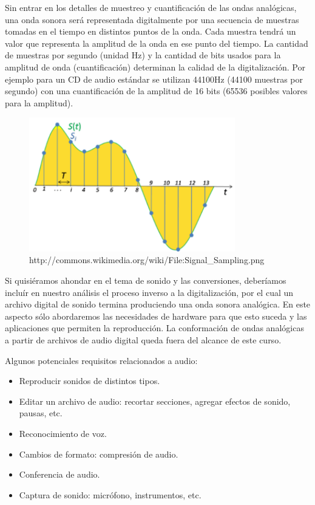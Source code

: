 \documentclass[12pt]{article}
\begin{document}
Sin entrar en los detalles de muestreo y cuantificación de las ondas analógicas, 
una onda sonora será representada digitalmente por una secuencia 
de muestras tomadas en el tiempo en distintos puntos de la onda. Cada muestra 
tendrá un valor que representa la amplitud de la onda en ese punto del tiempo.
La cantidad de muestras por segundo (unidad Hz) y la cantidad de bits usados 
para la amplitud de onda (cuantificación) determinan la calidad de la 
digitalización. Por ejemplo para un CD de audio estándar se utilizan 44100Hz
(44100 muestras por segundo) con una cuantificación de la amplitud de 16 bits
(65536 posibles valores para la amplitud). 


\begin{figure}[h]
\centering
\includegraphics[width=0.8\textwidth]{Sampling.png}
\renewcommand{\figurename}{Fig.}
\caption{http://commons.wikimedia.org/wiki/File:Signal\_Sampling.png}
\label{contexto:figura}
\end{figure}

Si quisiéramos ahondar en el tema de sonido y las conversiones, deberíamos 
incluír en nuestro análisis el proceso inverso a la digitalización, por el 
cual un archivo digital de sonido termina produciendo una onda sonora 
analógica. En este aspecto sólo abordaremos las necesidades de hardware
para que esto suceda y las aplicaciones que permiten la reproducción. La
conformación de ondas analógicas a partir de archivos de audio digital 
queda fuera del alcance de este curso. 




Algunos potenciales requisitos relacionados a audio:
\begin{itemize}
\item Reproducir sonidos de distintos tipos. 
\item Editar un archivo de audio: recortar secciones, 
agregar efectos de sonido, pausas, etc. 
\item Reconocimiento de voz. 
\item Cambios de formato: compresión de audio. 
\item Conferencia de audio. 
\item Captura de sonido: micrófono, instrumentos, etc. 
\end{itemize}
\end{document}
